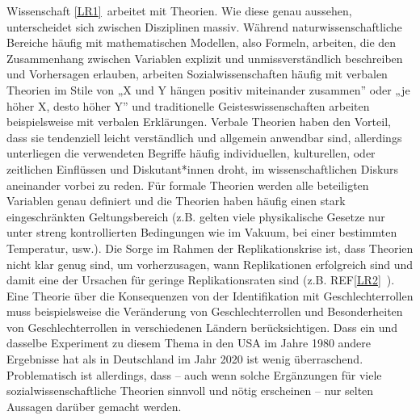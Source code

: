 \documentclass[
  letterpaper,
  DIV=11,
  numbers=noendperiod]{scrreprt}
\begin{document}
Wissenschaft \hyperref[_msocom_1]{{[}LR1{]}}~arbeitet mit Theorien. Wie
diese genau aussehen, unterscheidet sich zwischen Disziplinen massiv.
Während naturwissenschaftliche Bereiche häufig mit mathematischen
Modellen, also Formeln, arbeiten, die den Zusammenhang zwischen
Variablen explizit und unmissverständlich beschreiben und Vorhersagen
erlauben, arbeiten Sozialwissenschaften häufig mit verbalen Theorien im
Stile von „X und Y hängen positiv miteinander zusammen'' oder „je höher
X, desto höher Y'' und traditionelle Geisteswissenschaften arbeiten
beispielsweise mit verbalen Erklärungen. Verbale Theorien haben den
Vorteil, dass sie tendenziell leicht verständlich und allgemein
anwendbar sind, allerdings unterliegen die verwendeten Begriffe häufig
individuellen, kulturellen, oder zeitlichen Einflüssen und
Diskutant*innen droht, im wissenschaftlichen Diskurs aneinander vorbei
zu reden. Für formale Theorien werden alle beteiligten Variablen genau
definiert und die Theorien haben häufig einen stark eingeschränkten
Geltungsbereich (z.B. gelten viele physikalische Gesetze nur unter
streng kontrollierten Bedingungen wie im Vakuum, bei einer bestimmten
Temperatur, usw.). Die Sorge im Rahmen der Replikationskrise ist, dass
Theorien nicht klar genug sind, um vorherzusagen, wann Replikationen
erfolgreich sind und damit eine der Ursachen für geringe
Replikationsraten sind (z.B. REF\hyperref[_msocom_2]{{[}LR2{]}}~). Eine
Theorie über die Konsequenzen von der Identifikation mit
Geschlechterrollen muss beispielsweise die Veränderung von
Geschlechterrollen und Besonderheiten von Geschlechterrollen in
verschiedenen Ländern berücksichtigen. Dass ein und dasselbe Experiment
zu diesem Thema in den USA im Jahre 1980 andere Ergebnisse hat als in
Deutschland im Jahr 2020 ist wenig überraschend. Problematisch ist
allerdings, dass -- auch wenn solche Ergänzungen für viele
sozialwissenschaftliche Theorien sinnvoll und nötig erscheinen -- nur
selten Aussagen darüber gemacht werden.
\end{document}
